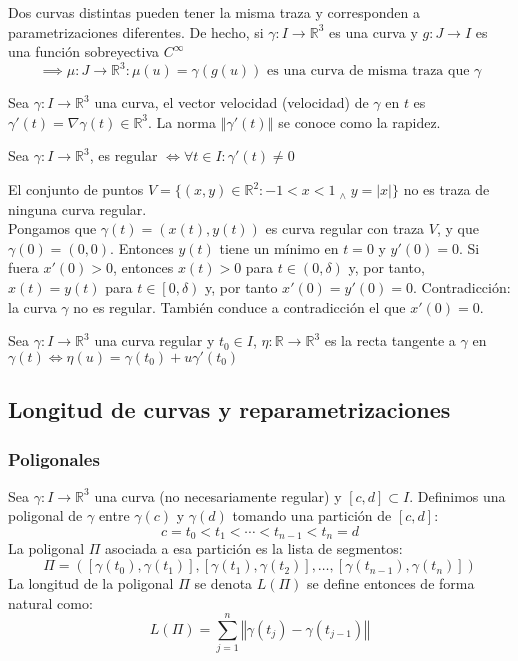 \documentclass[12pt]{article}
\theoremstyle{plain}
\newcommand{\R}{\mathbb{R}}
\newcommand{\norm}[1]{\left\Vert#1\right\Vert}
\newcommand{\appl}[3]{#1 \colon #2 \longrightarrow #3}
\newcommand{\we}{\; _{\wedge} \;}
\newcommand{\tex}[1]{\text{#1}}
\renewcommand{\norm}[1]{\left\Vert#1\right\Vert}
\begin{document}
\begin{obs}
	Dos curvas distintas pueden tener la misma traza y corresponden a parametrizaciones diferentes. De hecho, si $\appl{\gamma}{I}{\R^3}$ es una curva y $\appl{g}{J}{I}$ es una función sobreyectiva $C^{\infty}$
	\[\implies \appl{\mu}{J}{\R^3} : \mu(u)=\gamma\left(g(u)\right)\tex{ es una curva de misma traza que } \gamma\]
\end{obs}
\begin{defn}
	Sea $\appl{\gamma}{I}{\R^3}$ una curva, el vector velocidad (velocidad) de $\gamma$ en $t$ es $\gamma'(t)=\nabla\gamma(t)\in \R^3$. La norma $\norm{\gamma'(t)}$ se conoce como la rapidez.
\end{defn}
\begin{defn}
	Sea $\appl{\gamma}{I}{\R^3}$, es regular $\iff \forall t \in I : \gamma'(t)\ne 0$
\end{defn}
\begin{ejem}
	El conjunto de puntos $V=\{(x, y)\in \R^2:-1<x<1\we y=|x|\}$ no es traza de ninguna curva regular.\\
	\indent Pongamos que $\gamma(t)=(x(t), y(t))$ es curva regular con traza $V$, y que $\gamma(0)=(0,0)$. Entonces $y(t)$ tiene un mínimo en $t = 0$ y $y'(0) = 0$. Si fuera $x'(0) > 0$, entonces $x(t) > 0$ para $t \in (0, \delta)$ y, por tanto, $x(t) =y(t)$ para $t \in \left[0, \delta\right)$ y, por tanto $x'(0) = y'(0) = 0$. Contradicción: la curva $\gamma$ no es regular. También conduce a contradicción el que $x'(0) = 0$.
\end{ejem}
\begin{defn}
	Sea $\appl{\gamma}{I}{\R^3}$ una curva regular y $t_0\in I$, $\appl{\eta}{\R}{\R^3}$ es la recta tangente a $\gamma$ en $\gamma(t) \iff \eta(u)=\gamma(t_0)+u\gamma'(t_0)$
\end{defn}

\subsection{Longitud de curvas y reparametrizaciones}
\subsubsection{Poligonales}
Sea $\appl{\gamma}{I}{\R^3}$ una curva (no necesariamente regular) y $\left[c, d\right] \subset I$. Definimos una poligonal de $\gamma$ entre $\gamma(c)$ y $\gamma(d)$ tomando una partición de $\left[c, d\right]$:
\[c=t_0<t_1<\cdots<t_{n-1}<t_n=d\]
La poligonal $\Pi$ asociada a esa partición es la lista de segmentos:
\[\Pi=\left(\left[\gamma(t_0), \gamma(t_1)\right], \left[\gamma(t_1), \gamma(t_2)\right], \dots, \left[\gamma(t_{n-1}), \gamma(t_n)\right]\right)\]
La longitud de la poligonal $\Pi$ se denota $L(\Pi)$ se define entonces de forma natural como:
\[L(\Pi)=\sum_{j=1}^n \norm{\gamma(t_j)-\gamma(t_{j-1})}\]
\end{document}
